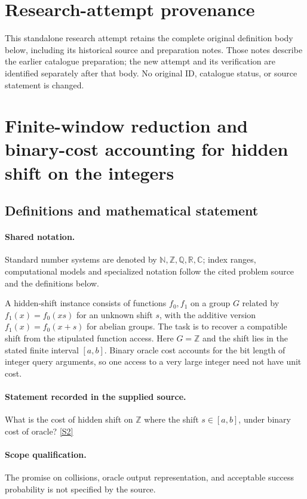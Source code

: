 \documentclass[11pt]{article}
\begin{document}
\section*{Research-attempt provenance}
This standalone research attempt retains the complete original definition body below,
including its historical source and preparation notes. Those notes describe the
earlier catalogue preparation; the new attempt and its verification are identified
separately after that body. No original ID, catalogue status, or source statement is changed.

\section{Finite-window reduction and binary-cost accounting for hidden shift on the integers}\label{statement}

\subsection{Definitions and mathematical statement}

\paragraph{Shared notation.}Standard number systems are denoted by $\mathbb N,\mathbb Z,\mathbb Q,\mathbb R,\mathbb C$; index ranges, computational models and specialized notation follow the cited problem source and the definitions below.


A hidden-shift instance consists of functions $f_0,f_1$ on a group $G$ related by $f_1(x)=f_0(xs)$ for an unknown shift $s$, with the additive version $f_1(x)=f_0(x+s)$ for abelian groups. The task is to recover a compatible shift from the stipulated function access. Here $G=\mathbb Z$ and the shift lies in the stated finite interval $[a,b]$. Binary oracle cost accounts for the bit length of integer query arguments, so one access to a very large integer need not have unit cost.
\paragraph{Statement recorded in the supplied source.}
What is the cost of hidden shift on $\mathbb Z$ where the shift $s\in [a,b]$, under binary cost of oracle? \href{http://aimpl.org/quantumalg/4/}{[S2]}
\paragraph{Scope qualification.}
The promise on collisions, oracle output representation, and acceptable success probability is not specified by the source.
\end{document}
